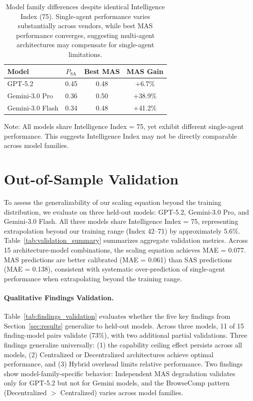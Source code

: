 \begin{table}[t]
\caption{Model family differences despite identical Intelligence Index (75). Single-agent performance varies substantially across vendors, while best MAS performance converges, suggesting multi-agent architectures may compensate for single-agent limitations.}
\label{tab:model_family_differences}
\centering
\begin{tabular}{l c c c}
\toprule
\textbf{Model} & $P_{\text{SA}}$ & Best MAS & MAS Gain \\
\midrule
GPT-5.2 & 0.45 & 0.48 & $+$6.7\% \\
Gemini-3.0 Pro & 0.36 & 0.50 & $+$38.9\% \\
Gemini-3.0 Flash & 0.34 & 0.48 & $+$41.2\% \\
\bottomrule
\end{tabular}
\vspace{2pt}
\begin{flushleft}
\footnotesize{Note: All models share Intelligence Index = 75, yet exhibit different single-agent performance. This suggests Intelligence Index may not be directly comparable across model families.}
\end{flushleft}
\end{table}


\section{Out-of-Sample Validation}
\label{sec:validation}

To assess the generalizability of our scaling equation beyond the training distribution, we evaluate on three held-out models: GPT-5.2, Gemini-3.0 Pro, and Gemini-3.0 Flash. All three models share Intelligence Index = 75, representing extrapolation beyond our training range (Index 42--71) by approximately 5.6\%. Table~\ref{tab:validation_summary} summarizes aggregate validation metrics. Across 15 architecture-model combinations, the scaling equation achieves MAE = 0.077. MAS predictions are better calibrated (MAE = 0.061) than SAS predictions (MAE = 0.138), consistent with systematic over-prediction of single-agent performance when extrapolating beyond the training range.

\paragraph{Qualitative Findings Validation.}
Table~\ref{tab:findings_validation} evaluates whether the five key findings from Section~\ref{sec:results} generalize to held-out models. Across three models, 11 of 15 finding-model pairs validate (73\%), with two additional partial validations. Three findings generalize universally: (1) the capability ceiling effect persists across all models, (2) Centralized or Decentralized architectures achieve optimal performance, and (3) Hybrid overhead limits relative performance. Two findings show model-family-specific behavior: Independent MAS degradation validates only for GPT-5.2 but not for Gemini models, and the BrowseComp pattern (Decentralized $>$ Centralized) varies across model families.

